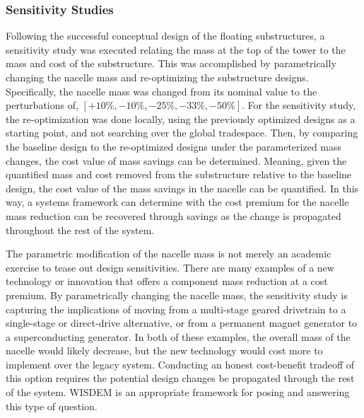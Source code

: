 \subsubsection{Sensitivity Studies}
Following the successful conceptual design of the floating
substructures, a sensitivity study was executed relating the mass at the top of the
tower to the mass and cost of the substructure.  This was accomplished
by parametrically changing the nacelle mass and re-optimizing the
substructure designs.  Specifically, the nacelle mass was changed from
its nominal value to the perturbations of, $[+10\%, -10\%, -25\%, -33\%,
  -50\%]$.  For the sensitivity study, the re-optimization was done locally,
using the previously optimized designs as a starting point, and not
searching over the global tradespace.  Then, by
comparing the baseline design to the re-optimized designs under the
parameterized mass changes, the cost value of mass savings can be
determined.  Meaning, given the quantified mass and cost removed from
the substructure relative to the baseline design, the cost value of the
mass savings in the nacelle can be quantified.  In this way, a systems
framework can determine with the cost premium for the nacelle mass
reduction can be recovered through savings as the change is propagated
throughout the rest of the system.

The parametric modification of the nacelle mass is not merely an
academic exercise to tease out design sensitivities.  There are many
examples of a new technology or innovation that offers a component mass
reduction at a cost premium.  By parametrically changing the nacelle
mass, the sensitivity study is capturing the implications of moving from a
multi-stage geared drivetrain to a single-stage or direct-drive
alternative, or from a permanent magnet generator to a superconducting
generator.  In both of these examples, the overall mass of the nacelle
would likely decrease, but the new technology would cost more to
implement over the legacy system.  Conducting an honest cost-benefit
tradeoff of this option requires the potential design changes be
propagated through the rest of the system.  WISDEM is an appropriate
framework for posing and answering this type of question.


